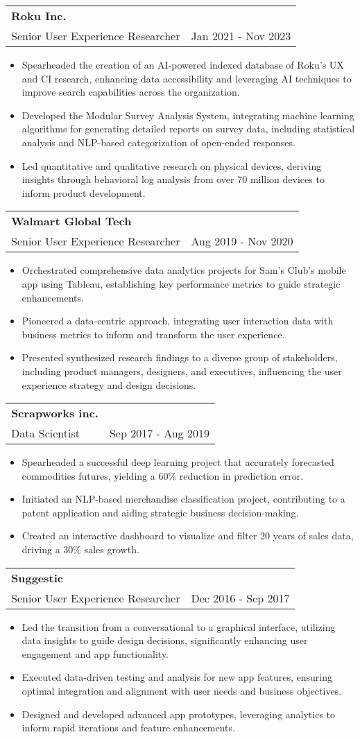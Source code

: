 \documentclass[letterpaper,10.9pt]{article}
\makeatletter
\newcommand{\resumeItem}[1]{
  \item\small{
    {#1 \vspace{-2pt}}
  }
}
\newcommand{\resumeSubheading}[4]{
  \vspace{-2pt}\item
    \begin{tabular*}{0.97\textwidth}[t]{l@{\extracolsep{\fill}}r}
      \textbf{#1} & #2 \\
      \small#3 & \small#4 \\
    \end{tabular*}\vspace{-7pt}
}
\newcommand{\resumeItemListStart}{\begin{itemize}}
\newcommand{\resumeItemListEnd}{\end{itemize}\vspace{-5pt}}
\makeatother
\begin{document}
    \resumeSubheading
      {Roku Inc.}{}
      {Senior User Experience Researcher}{Jan 2021 - Nov 2023}
        \resumeItemListStart
            \resumeItem{Spearheaded the creation of an AI-powered indexed database of Roku's UX and CI research, enhancing data accessibility and leveraging AI techniques to improve search capabilities across the organization.}
            \resumeItem{Developed the Modular Survey Analysis System, integrating machine learning algorithms for generating detailed reports on survey data, including statistical analysis and NLP-based categorization of open-ended responses.}
            \resumeItem{Led quantitative and qualitative research on physical devices, deriving insights through behavioral log analysis from over 70 million devices to inform product development.}
        \resumeItemListEnd

    \resumeSubheading
      {Walmart Global Tech}{}
      {Senior User Experience Researcher}{Aug 2019 - Nov 2020}
        \resumeItemListStart
            \resumeItem {Orchestrated comprehensive data analytics projects for Sam's Club's mobile app using Tableau, establishing key performance metrics to guide strategic enhancements.}
            \resumeItem {Pioneered a data-centric approach, integrating user interaction data with business metrics to inform and transform the user experience.}
            \resumeItem{Presented synthesized research findings to a diverse group of stakeholders, including product managers, designers, and executives, influencing the user experience strategy and design decisions.}
        \resumeItemListEnd

    \resumeSubheading
      {Scrapworks inc.}{}
      {Data Scientist}{Sep 2017 - Aug 2019}
        \resumeItemListStart
            \resumeItem {Spearheaded a successful deep learning project that accurately forecasted commodities futures, yielding a 60\% reduction in prediction error.}
            \resumeItem {Initiated an NLP-based merchandise classification project, contributing to a patent application and aiding strategic business decision-making.}
            \resumeItem{Created an interactive dashboard to visualize and filter 20 years of sales data, driving a 30\% sales growth.}
        \resumeItemListEnd

    \resumeSubheading
      {Suggestic}{}
      {Senior User Experience Researcher}{Dec 2016 - Sep 2017}
        \resumeItemListStart
            \resumeItem {Led the transition from a conversational to a graphical interface, utilizing data insights to guide design decisions, significantly enhancing user engagement and app functionality.}
            \resumeItem {Executed data-driven testing and analysis for new app features, ensuring optimal integration and alignment with user needs and business objectives.}
            \resumeItem{Designed and developed advanced app prototypes, leveraging analytics to inform rapid iterations and feature enhancements.}
        \resumeItemListEnd
\end{document}
